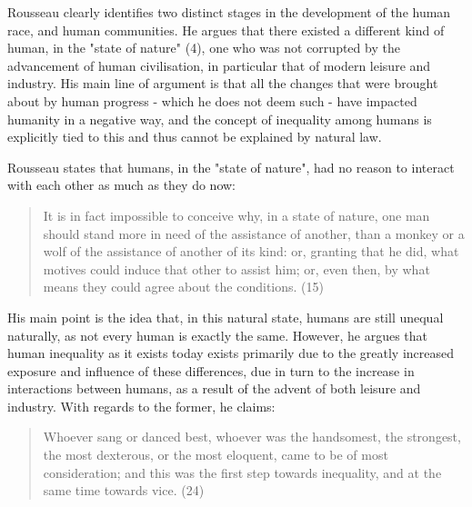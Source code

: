 

Rousseau clearly identifies two distinct stages in the development of the human race, and human communities. He argues that there existed a different kind of human, in the "state of nature" (4), one who was not corrupted by the advancement of human civilisation, in particular that of modern leisure and industry. His main line of argument is that all the changes that were brought about by human progress - which he does not deem such - have impacted humanity in a negative way, and the concept of inequality among humans is explicitly tied to this and thus cannot be explained by natural law.

Rousseau states that humans, in the "state of nature", had no reason to interact with each other as much as they do now:

\begin{quote}
  It is in fact impossible to conceive why, in a state of nature, one man should stand more in need of the assistance of another, than a monkey or a wolf of the assistance of another of its kind: or, granting that he did, what motives could induce that other to assist him; or, even then, by what means they could agree about the conditions. (15)
\end{quote}

His main point is the idea that, in this natural state, humans are still unequal naturally, as not every human is exactly the same. However, he argues that human inequality as it exists today exists primarily due to the greatly increased exposure and influence of these differences, due in turn to the increase in interactions between humans, as a result of the advent of both leisure and industry. With regards to the former, he claims:

\begin{quote}
  Whoever sang or danced best, whoever was the handsomest, the strongest, the most dexterous, or the most eloquent, came to be of most consideration; and this was the first step towards inequality, and at the same time towards vice. (24)
\end{quote}

